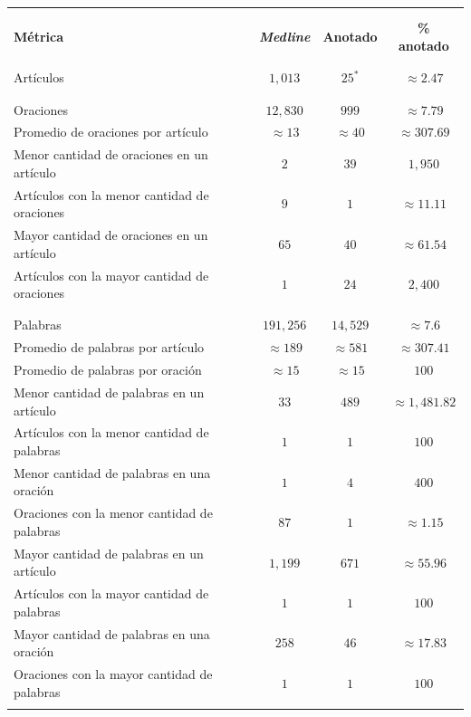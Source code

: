 \begin{table}[H]
	\begin{center}
		\begin{tabular}{lccc}
			\noalign{\hrule height 1pt}\\
			\vspace{-0.35in}\\
			\textbf{Métrica} & \textbf{\textit{Medline}} & \textbf{Anotado} & \textbf{\% anotado}\\
			\hline\\
			\vspace{-0.35in}\\
			\small{Artículos} & $1,013$ & $25^*$ & $\approx2.47$\\
			\hline\\
			\vspace{-0.35in}\\
			\small{Oraciones} & $12,830$ & $999$ & $\approx7.79$\\
			\small{Promedio de oraciones por artículo} & $\approx13$ & $\approx40$ & $\approx307.69$\\
			\small{Menor cantidad de oraciones en un artículo} & $2$ & $39$ & $1,950$\\
			\small{Artículos con la menor cantidad de oraciones} & $9$ & $1$ & $\approx11.11$\\
			\small{Mayor cantidad de oraciones en un artículo} & $65$ & $40$ & $\approx61.54$\\
			\small{Artículos con la mayor cantidad de oraciones} & $1$ & $24$ & $2,400$\\
			\hline\\
			\vspace{-0.35in}\\
			\small{Palabras} & $191,256$ & $14,529$ & $\approx7.6$\\
			\small{Promedio de palabras por artículo} & $\approx189$ & $\approx581$ & $\approx307.41$\\
			\small{Promedio de palabras por oración} & $\approx15$ & $\approx15$ & $100$\\
			\small{Menor cantidad de palabras en un artículo} & $33$ & $489$ & $\approx1,481.82$\\
			\small{Artículos con la menor cantidad de palabras} & $1$ & $1$ & $100$\\
			\small{Menor cantidad de palabras en una oración} & $1$ & $4$ & $400$\\
			\small{Oraciones con la menor cantidad de palabras} & $87$ & $1$ & $\approx1.15$\\
			\small{Mayor cantidad de palabras en un artículo} & $1,199$ & $671$ & $\approx55.96$\\
			\small{Artículos con la mayor cantidad de palabras} & $1$ & $1$ & $100$\\
			\small{Mayor cantidad de palabras en una oración} & $258$ & $46$ & $\approx17.83$\\
			\small{Oraciones con la mayor cantidad de palabras} & $1$ & $1$ & $100$\\
			\noalign{\hrule height 1pt}\\
		\end{tabular}


\end{center}
\end{table}
